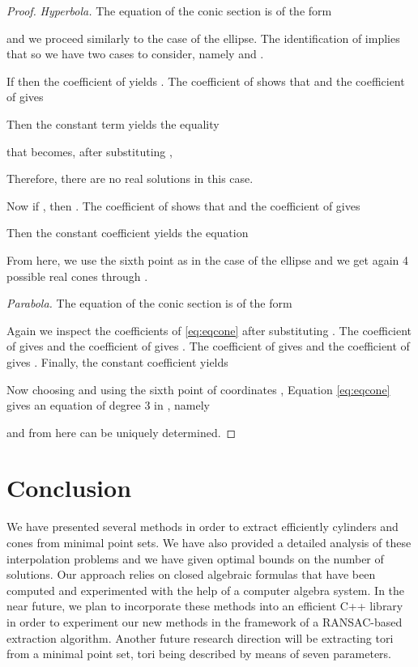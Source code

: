 \documentclass[5p]{elsarticle}
\newcommand{\com}[1]{{\color{black} #1}}
\begin{document}
\begin{proof}
\medskip	
	
\noindent \textit{Hyperbola.} The equation of the conic section is of the form   
	
and we proceed similarly to the case of the ellipse. The identification of  implies that  so we have \com{two} cases to consider, namely  and . 

If  then the coefficient of  yields . The coefficient of  shows that  and the coefficient of  gives
 
\com{Then} the constant term yields the equality

\com{that} becomes, after \com{substituting} , 

Therefore, there are no real solutions in this case. 

\com{Now} if , then . \com{The} coefficient of  shows that  and the coefficient of  gives
   	
\com{Then} the constant coefficient yields the equation
 
From here, we use the sixth point as in the case of the ellipse and we get again 4 possible real cones through .

\medskip	
	
\noindent \textit{Parabola.} The equation of the conic section is of the form 
	
\com{Again} we inspect the coefficients of \eqref{eq:eqcone} after \com{substituting} . The coefficient of  gives  and the coefficient of  gives . The coefficient of  gives  and the coefficient of  gives . Finally, the constant coefficient yields 

\com{Now} choosing  and using the sixth point of coordinates , \com{Equation}  \eqref{eq:eqcone} gives an equation of degree 3 in , namely
	
and from here  can be uniquely determined.
\end{proof}


\section{Conclusion}

\com{We} have presented several methods in order to extract efficiently cylinders and cones from minimal point sets. We have also provided a detailed analysis of these interpolation problems and we have given optimal bounds on the number of solutions. Our approach relies on closed algebraic formulas that have been computed and experimented with the help of a computer algebra system. In \com{the} near future, we plan to \com{incorporate} these methods into an efficient C++ library \com{in order to experiment our new methods in the framework of a RANSAC-based extraction algorithm}. Another future research direction will be \com{extracting} tori from a minimal point set, tori being described by means of seven parameters. 
\end{document}
